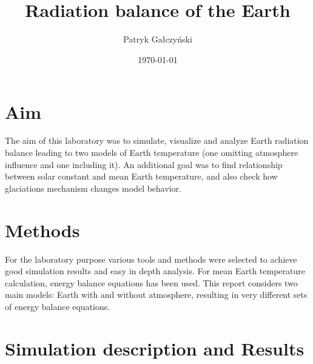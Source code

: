 \documentclass[onecolumn]{article}
\title{\spacecaps{Lab report: Lab 5 }\\
Radiation balance of the Earth\\\normalsize \spacesc{Modeling of Physical Systems} }
\author{Patryk Gałczyński}
\date{\today}
\begin{document}

\maketitle


\section{Aim}
\large
The aim of this laboratory was to simulate, visualize and analyze Earth radiation balance leading to two models of Earth temperature (one omitting atmosphere influence and one including it). An additional goal was to find relationship between solar constant and mean Earth temperature, and also check how glaciations mechanism changes model behavior.


\section{Methods}
For the laboratory purpose various tools and methods were selected to achieve good simulation results and easy in depth analysis. For mean Earth temperature calculation, energy balance equations has been used. This report considers two main models: Earth with and without atmosphere, resulting in very different sets of energy balance equations.

\section{Simulation description and Results}
\end{document}
